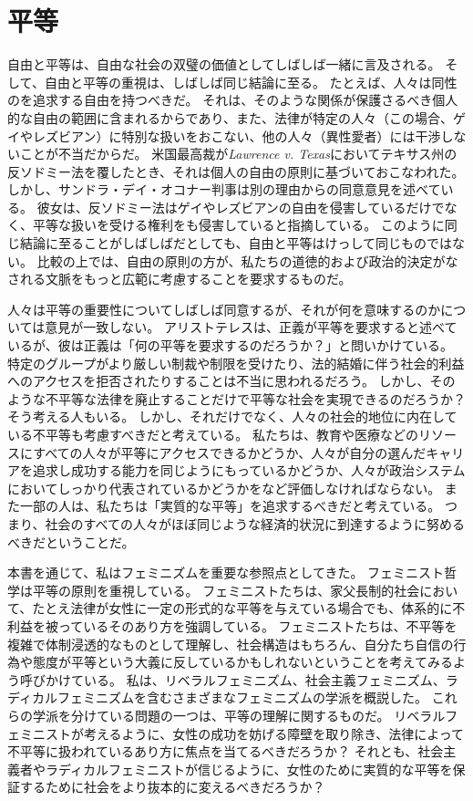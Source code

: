 \documentclass[paper=a4,book,openany]{jlreq}
\begin{document}
\section{平等}

自由と平等は、自由な社会の双璧の価値としてしばしば一緒に言及される。
そして、自由と平等の重視は、しばしば同じ結論に至る。
たとえば、人々は同性のを追求する自由を持つべきだ。
それは、そのような関係が保護さるべき個人的な自由の範囲に含まれるからであり、また、法律が特定の人々（この場合、ゲイやレズビアン）に特別な扱いをおこない、他の人々（異性愛者）には干渉しないことが不当だからだ。
米国最高裁が\emph{Lawrence v. Texas}においてテキサス州の反ソドミー法を覆したとき、それは個人の自由の原則に基づいておこなわれた。
しかし、サンドラ・デイ・オコナー判事は別の理由からの同意意見を述べている。
彼女は、反ソドミー法はゲイやレズビアンの自由を侵害しているだけでなく、平等な扱いを受ける権利をも侵害していると指摘している。
このように同じ結論に至ることがしばしばだとしても、自由と平等はけっして同じものではない。
比較の上では、自由の原則の方が、私たちの道徳的および政治的決定がなされる文脈をもっと広範に考慮することを要求するものだ。

人々は平等の重要性についてしばしば同意するが、それが何を意味するのかについては意見が一致しない。
アリストテレスは、正義が平等を要求すると述べているが、彼は正義は「何の平等を要求するのだろうか？」と問いかけている。
特定のグループがより厳しい制裁や制限を受けたり、法的結婚に伴う社会的利益へのアクセスを拒否されたりすることは不当に思われるだろう。
しかし、そのような不平等な法律を廃止することだけで平等な社会を実現できるのだろうか？ そう考える人もいる。
しかし、それだけでなく、人々の社会的地位に内在している不平等も考慮すべきだと考えている。
私たちは、教育や医療などのリソースにすべての人々が平等にアクセスできるかどうか、人々が自分の選んだキャリアを追求し成功する能力を同じようにもっているかどうか、人々が政治システムにおいてしっかり代表されているかどうかをなど評価しなければならない。
また一部の人は、私たちは「実質的な平等」を追求するべきだと考えている。
つまり、社会のすべての人々がほぼ同じような経済的状況に到達するように努めるべきだということだ。

本書を通じて、私はフェミニズムを重要な参照点としてきた。
フェミニスト哲学は平等の原則を重視している。
フェミニストたちは、家父長制的社会において、たとえ法律が女性に一定の形式的な平等を与えている場合でも、体系的に不利益を被っているそのあり方を強調している。
フェミニストたちは、不平等を複雑で体制浸透的なものとして理解し、社会構造はもちろん、自分たち自信の行為や態度が平等という大義に反しているかもしれないということを考えてみるよう呼びかけている。
私は、リベラルフェミニズム、社会主義フェミニズム、ラディカルフェミニズムを含むさまざまなフェミニズムの学派を概説した。
これらの学派を分けている問題の一つは、平等の理解に関するものだ。
リベラルフェミニストが考えるように、女性の成功を妨げる障壁を取り除き、法律によって不平等に扱われているあり方に焦点を当てるべきだろうか？ それとも、社会主義者やラディカルフェミニストが信じるように、女性のために実質的な平等を保証するために社会をより抜本的に変えるべきだろうか？
\end{document}
